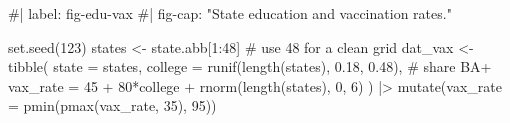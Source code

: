 \documentclass[
  letterpaper,
  DIV=11,
  numbers=noendperiod]{scrreprt}
\newenvironment{Shaded}{\begin{snugshade}}{\end{snugshade}}
\newcommand{\AttributeTok}[1]{\textcolor[rgb]{0.40,0.45,0.13}{#1}}
\newcommand{\CommentTok}[1]{\textcolor[rgb]{0.37,0.37,0.37}{#1}}
\newcommand{\DecValTok}[1]{\textcolor[rgb]{0.68,0.00,0.00}{#1}}
\newcommand{\FloatTok}[1]{\textcolor[rgb]{0.68,0.00,0.00}{#1}}
\newcommand{\FunctionTok}[1]{\textcolor[rgb]{0.28,0.35,0.67}{#1}}
\newcommand{\NormalTok}[1]{\textcolor[rgb]{0.00,0.23,0.31}{#1}}
\newcommand{\OtherTok}[1]{\textcolor[rgb]{0.00,0.23,0.31}{#1}}
\newcommand{\SpecialCharTok}[1]{\textcolor[rgb]{0.37,0.37,0.37}{#1}}
\begin{document}
\begin{Shaded}
\begin{Highlighting}[]
\CommentTok{\#| label: fig{-}edu{-}vax}
\CommentTok{\#| fig{-}cap: "State education and vaccination rates."}

\FunctionTok{set.seed}\NormalTok{(}\DecValTok{123}\NormalTok{)}
\NormalTok{states }\OtherTok{\textless{}{-}}\NormalTok{ state.abb[}\DecValTok{1}\SpecialCharTok{:}\DecValTok{48}\NormalTok{] }\CommentTok{\# use 48 for a clean grid}
\NormalTok{dat\_vax }\OtherTok{\textless{}{-}} \FunctionTok{tibble}\NormalTok{(}
  \AttributeTok{state =}\NormalTok{ states,}
  \AttributeTok{college =} \FunctionTok{runif}\NormalTok{(}\FunctionTok{length}\NormalTok{(states), }\FloatTok{0.18}\NormalTok{, }\FloatTok{0.48}\NormalTok{),  }\CommentTok{\# share BA+}
  \AttributeTok{vax\_rate =} \DecValTok{45} \SpecialCharTok{+} \DecValTok{80}\SpecialCharTok{*}\NormalTok{college }\SpecialCharTok{+} \FunctionTok{rnorm}\NormalTok{(}\FunctionTok{length}\NormalTok{(states), }\DecValTok{0}\NormalTok{, }\DecValTok{6}\NormalTok{)}
\NormalTok{) }\SpecialCharTok{|\textgreater{}}
  \FunctionTok{mutate}\NormalTok{(}\AttributeTok{vax\_rate =} \FunctionTok{pmin}\NormalTok{(}\FunctionTok{pmax}\NormalTok{(vax\_rate, }\DecValTok{35}\NormalTok{), }\DecValTok{95}\NormalTok{))}


\end{Highlighting}
\end{Shaded}
\end{document}
